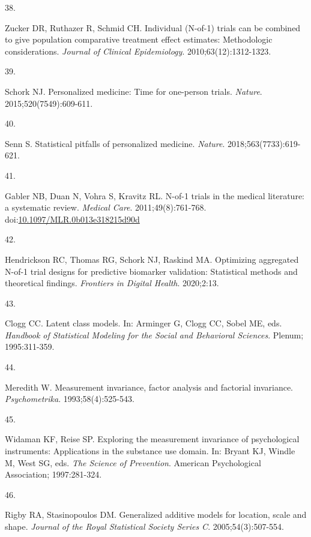 \documentclass[
  11pt,
]{article}
\newlength{\cslhangindent}
\newlength{\csllabelwidth}
\newenvironment{CSLReferences}[2] %
 {\begin{list}{}{%
  \setlength{\itemindent}{0pt}
  \setlength{\leftmargin}{0pt}
  \setlength{\parsep}{0pt}
  \ifodd #1
   \setlength{\leftmargin}{\cslhangindent}
   \setlength{\itemindent}{-1\cslhangindent}
  \fi
  \setlength{\itemsep}{#2\baselineskip}}}
 {\end{list}}
\newcommand{\CSLLeftMargin}[1]{\parbox[t]{\csllabelwidth}{\strut#1\strut}}
\newcommand{\CSLRightInline}[1]{\parbox[t]{\linewidth - \csllabelwidth}{\strut#1\strut}}
\begin{document}
\begin{CSLReferences}{0}{1}
\CSLLeftMargin{38. }%
\CSLRightInline{Zucker DR, Ruthazer R, Schmid CH. Individual ({N}-of-1) trials can be combined to give population comparative treatment effect estimates: Methodologic considerations. \emph{Journal of Clinical Epidemiology}. 2010;63(12):1312-1323.}

\CSLLeftMargin{39. }%
\CSLRightInline{Schork NJ. Personalized medicine: Time for one-person trials. \emph{Nature}. 2015;520(7549):609-611.}

\CSLLeftMargin{40. }%
\CSLRightInline{Senn S. Statistical pitfalls of personalized medicine. \emph{Nature}. 2018;563(7733):619-621.}

\CSLLeftMargin{41. }%
\CSLRightInline{Gabler NB, Duan N, Vohra S, Kravitz RL. {N-of-1 trials in the medical literature: a systematic review}. \emph{Medical Care}. 2011;49(8):761-768. doi:\href{https://doi.org/10.1097/MLR.0b013e318215d90d}{10.1097/MLR.0b013e318215d90d}}

\CSLLeftMargin{42. }%
\CSLRightInline{Hendrickson RC, Thomas RG, Schork NJ, Raskind MA. Optimizing aggregated {N}-of-1 trial designs for predictive biomarker validation: Statistical methods and theoretical findings. \emph{Frontiers in Digital Health}. 2020;2:13.}

\CSLLeftMargin{43. }%
\CSLRightInline{Clogg CC. Latent class models. In: Arminger G, Clogg CC, Sobel ME, eds. \emph{Handbook of Statistical Modeling for the Social and Behavioral Sciences}. Plenum; 1995:311-359.}

\CSLLeftMargin{44. }%
\CSLRightInline{Meredith W. Measurement invariance, factor analysis and factorial invariance. \emph{Psychometrika}. 1993;58(4):525-543.}

\CSLLeftMargin{45. }%
\CSLRightInline{Widaman KF, Reise SP. Exploring the measurement invariance of psychological instruments: Applications in the substance use domain. In: Bryant KJ, Windle M, West SG, eds. \emph{The Science of Prevention}. American Psychological Association; 1997:281-324.}

\CSLLeftMargin{46. }%
\CSLRightInline{Rigby RA, Stasinopoulos DM. Generalized additive models for location, scale and shape. \emph{Journal of the Royal Statistical Society Series C}. 2005;54(3):507-554.}


\end{CSLReferences}
\end{document}
